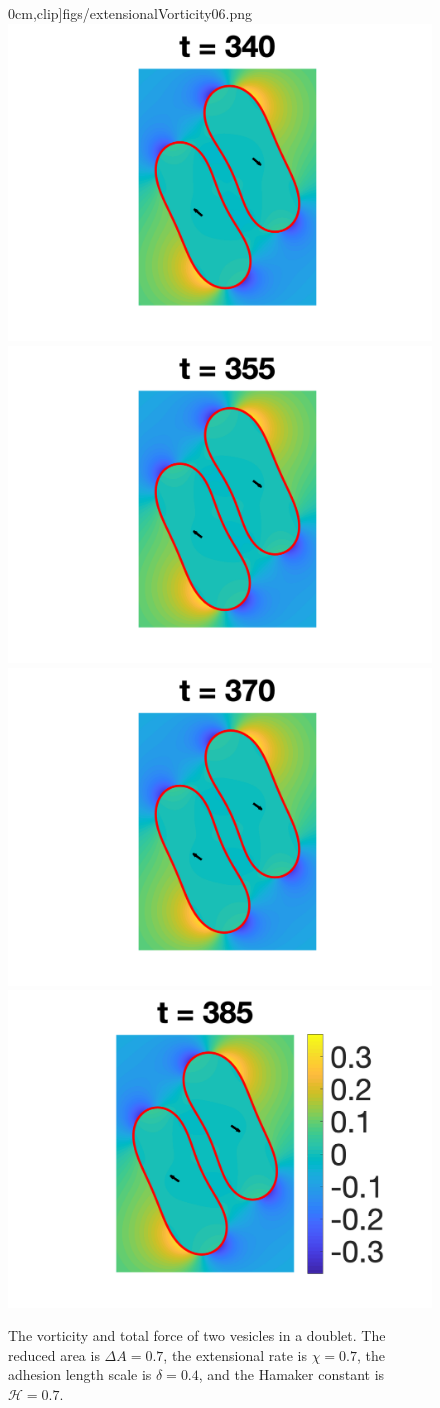 \documentclass[prf,superscriptaddress,showpacs]{revtex4-1}
\begin{document}
\begin{figure}[htp]
{  0cm},clip]{figs/extensionalVorticity06.png}
  \includegraphics[height = 0.26\textwidth,trim={6cm 1cm 5cm
  0cm},clip]{figs/extensionalVorticity07.png}
  \includegraphics[height = 0.26\textwidth,trim={6cm 1cm 5cm
  0cm},clip]{figs/extensionalVorticity08.png}
  \includegraphics[height = 0.26\textwidth,trim={6cm 1cm 5cm
  0cm},clip]{figs/extensionalVorticity09.png}
  \includegraphics[height = 0.26\textwidth,trim={5cm 1cm 2cm
  0cm},clip]{figs/extensionalVorticity10.png}
  \caption{\label{fig:extensionalVorticity} The vorticity and total
  force of two vesicles in a doublet.  The reduced area is $\Delta A = 0.7$,
  the extensional rate is $\chi = 0.7$, the adhesion length scale is
  $\delta = 0.4$, and the Hamaker constant is $\mathcal{H} = 0.7$.}
\end{figure}


\end{document}
